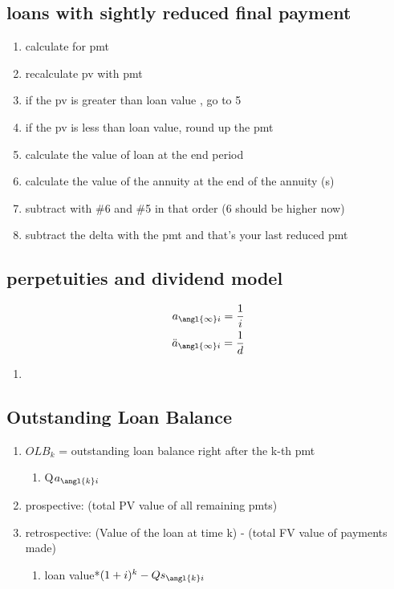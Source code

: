 \documentclass[12pt]{article}
\begin{document}
\subsection{loans with sightly reduced final payment}
\begin{enumerate}
	\item calculate for pmt
	\item recalculate pv with pmt
	\item if the pv is greater than loan value , go to 5
	\item if the pv is less than loan value, round up the pmt
	\item calculate the value of loan at the end period
	\item calculate the value of the annuity at the end of the annuity (s)
	\item subtract with \#6 and \#5 in that order (6 should be higher now)
	\item subtract the delta with the pmt and that's your last reduced pmt
\end{enumerate}
\subsection{perpetuities and dividend model}
\begin{align}
	a_{\angl{\infty}i} = \frac{1}{i} \nonumber \\
	 \ddot{a}_{\angl{\infty}i} = \frac{1}{d} \nonumber
\end{align}
\begin{enumerate}
	\item 
\end{enumerate}

\subsection{Outstanding Loan Balance}
\begin{enumerate}
	\item $OLB_k$ = outstanding loan balance right after the k-th pmt
	\begin{enumerate}
		\item Q$a_{\angl{k}i}$
	\end{enumerate}
	\item prospective: (total PV value of all remaining pmts)
	\item retrospective: (Value of the loan at time k) - (total FV value of payments made)
	\begin{enumerate}
		\item loan value*$(1+i)^k - Qs_{\angl{k}i}$
	\end{enumerate}
\end{enumerate}
\end{document}
